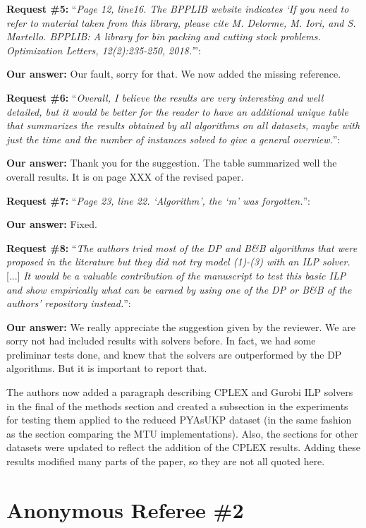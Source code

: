 \documentclass{elsarticle}
\begin{document}
\textbf{Request \#5:} ``\textit{Page 12, line16. The BPPLIB website indicates `If you need to refer to material taken from this library, please cite M. Delorme, M. Iori, and S. Martello. BPPLIB: A library for bin packing and cutting stock problems. Optimization Letters, 12(2):235-250, 2018.'}'':

\textbf{Our answer:} Our fault, sorry for that. We now added the missing reference.
\bigskip

\textbf{Request \#6:} ``\textit{Overall, I believe the results are very interesting and well detailed, but it would be better for the reader to have an additional unique table that summarizes the results obtained by all algorithms on all datasets, maybe with just the time and the number of instances solved to give a general overview.}'':

\textbf{Our answer:} Thank you for the suggestion. The table summarized well the overall results. It is on page XXX of the revised paper.
\bigskip

\textbf{Request \#7:} ``\textit{Page 23, line 22. `Algorithm', the `m' was forgotten.}'':

\textbf{Our answer:} Fixed.
\bigskip

\textbf{Request \#8:} ``\textit{The authors tried most of the DP and B\&B algorithms that were proposed in the literature but they did not try model (1)-(3) with an ILP solver.} [...] \textit{It would be a valuable contribution of the manuscript to test this basic ILP and show empirically what can be earned by using one of the DP or B\&B of the authors' repository instead.}'':

\textbf{Our answer:}
We really appreciate the suggestion given by the reviewer.
We are sorry not had included results with solvers before.
In fact, we had some preliminar tests done, and knew that the solvers are outperformed by the DP algorithms.
But it is important to report that.

The authors now added a paragraph describing CPLEX and Gurobi ILP solvers in the final of the methods section and created a subsection in the experiments for testing them applied to the reduced PYAsUKP dataset (in the same fashion as the section comparing the MTU implementations). Also, the sections for other datasets were updated to reflect the addition of the CPLEX results. Adding these results modified many parts of the paper, so they are not all quoted here.
\bigskip

\newpage
\section{Anonymous Referee \#2}
\end{document}
